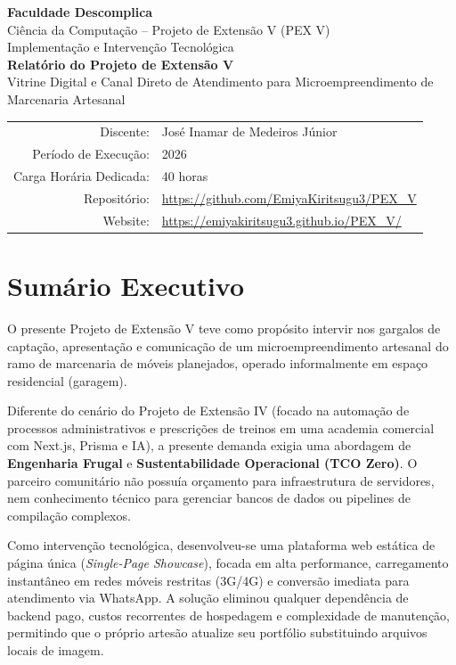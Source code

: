 \documentclass[12pt,a4paper]{article}
\begin{document}
\begin{center}
{\large\textbf{Faculdade Descomplica}}\\[4pt]
{\large Ciência da Computação -- Projeto de Extensão V (PEX V)}\\[4pt]
Implementação e Intervenção Tecnológica\\[12pt]
{\Large\textbf{Relatório do Projeto de Extensão V}}\\[6pt]
{\large Vitrine Digital e Canal Direto de Atendimento para Microempreendimento de Marcenaria Artesanal}\\[12pt]
\begin{tabular}{rl}
Discente: & José Inamar de Medeiros Júnior \\
Período de Execução: & 2026 \\
Carga Horária Dedicada: & 40 horas \\
Repositório: & \url{https://github.com/EmiyaKiritsugu3/PEX_V} \\
Website: & \url{https://emiyakiritsugu3.github.io/PEX_V/} \\
\end{tabular}
\end{center}
\vspace{12pt}





\section{Sumário Executivo}

O presente Projeto de Extensão V teve como propósito intervir nos gargalos de captação, apresentação e comunicação de um microempreendimento artesanal do ramo de marcenaria de móveis planejados, operado informalmente em espaço residencial (garagem).

Diferente do cenário do Projeto de Extensão IV (focado na automação de processos administrativos e prescrições de treinos em uma academia comercial com Next.js, Prisma e IA), a presente demanda exigia uma abordagem de \textbf{Engenharia Frugal} e \textbf{Sustentabilidade Operacional (TCO Zero)}. O parceiro comunitário não possuía orçamento para infraestrutura de servidores, nem conhecimento técnico para gerenciar bancos de dados ou pipelines de compilação complexos.

Como intervenção tecnológica, desenvolveu-se uma plataforma web estática de página única (\textit{Single-Page Showcase}), focada em alta performance, carregamento instantâneo em redes móveis restritas (3G/4G) e conversão imediata para atendimento via WhatsApp. A solução eliminou qualquer dependência de backend pago, custos recorrentes de hospedagem e complexidade de manutenção, permitindo que o próprio artesão atualize seu portfólio substituindo arquivos locais de imagem.
\end{document}
